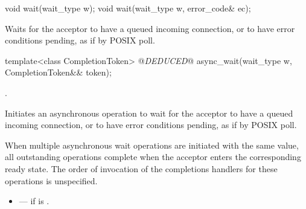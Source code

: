 \begin{itemdecl}
void wait(wait_type w);
void wait(wait_type w, error_code& ec);
\end{itemdecl}

\begin{itemdescr}
\pnum
\effects Waits for the acceptor to have a queued incoming connection, or to have error conditions pending, as if by POSIX poll.
\end{itemdescr}

\begin{itemdecl}
template<class CompletionToken>
  @\textit{DEDUCED}@ async_wait(wait_type w, CompletionToken&& token);
\end{itemdecl}

\begin{itemdescr}
\pnum
\completionsig {}.

\pnum
\effects Initiates an asynchronous operation to wait for the acceptor to have a queued incoming connection, or to have error conditions pending, as if by POSIX poll.

\pnum
When multiple asynchronous wait operations are initiated with the same  value, all outstanding operations complete when the acceptor enters the corresponding ready state. The order of invocation of the completions handlers for these operations is unspecified.

\pnum
\errors
\begin{itemize}
\item
{} --- if  is .
\end{itemize}
\end{itemdescr}




